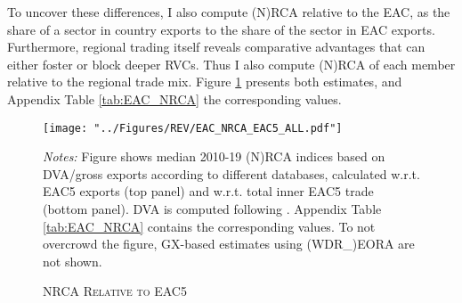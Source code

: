 \documentclass[a4paper]{article}
\begin{document}
To uncover these differences, I also compute (N)RCA relative to the EAC, as the share of a sector in country exports to the share of the sector in EAC exports. Furthermore, regional trading itself reveals comparative advantages that can either foster or block deeper RVCs. Thus I also compute (N)RCA of each member relative to the regional trade mix. Figure \ref{fig:EAC_NRCA} presents both estimates, and Appendix Table \ref{tab:EAC_NRCA} the corresponding values. 

\begin{figure}[h!]
\centering
\caption{\label{fig:EAC_NRCA}\textsc{NRCA Relative to EAC5}}
\texttt{[image: "../Figures/REV/EAC\_NRCA\_EAC5\_ALL.pdf"]} %
\raggedright
\scriptsize
\emph{Notes:} Figure shows median 2010-19 (N)RCA indices based on DVA/gross exports according to different databases, calculated w.r.t. EAC5 exports (top panel) and w.r.t. total inner EAC5 trade (bottom panel). DVA is computed following \citet{borin2019measuring}. Appendix Table \ref{tab:EAC_NRCA} contains the corresponding values. To not overcrowd the figure, GX-based estimates using (WDR\_)EORA are not shown.
\end{figure}
\FloatBarrier
\end{document}
